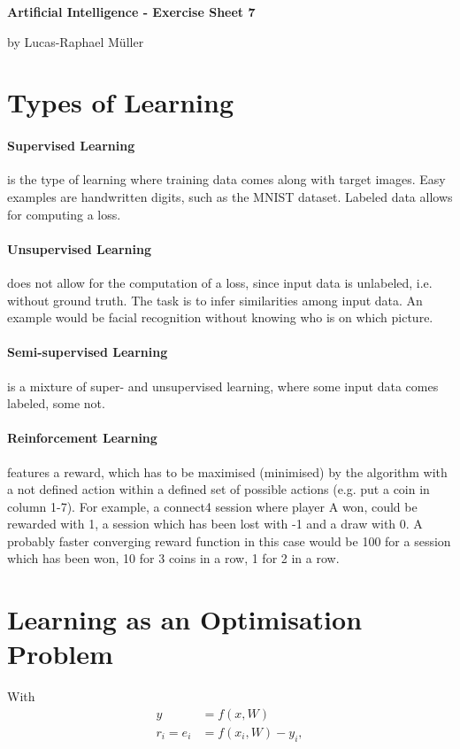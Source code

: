 \documentclass[11pt,a4paper,twoside]{article}
\begin{document}
\renewcommand\thesubsection{\alph{subsection})}

\lstset {
language = bash,
	breaklines = true,
	breakatwhitespace = true
}

\centerline{\LARGE \textbf{Artificial Intelligence - Exercise Sheet 7}}\vspace{0.5em}
\centerline{\large by Lucas-Raphael Müller}\vspace{2em}


\section{Types of Learning}
\paragraph{Supervised Learning} is the type of learning where training data comes along with target images. Easy examples are handwritten digits, such as the MNIST dataset. Labeled data allows for computing a loss.
\paragraph{Unsupervised Learning} does not allow for the computation of a loss, since input data is unlabeled, i.e. without ground truth.
The task is to infer similarities among input data.  
An example would be facial recognition without knowing who is on which picture.
\paragraph{Semi-supervised Learning} is a mixture of super- and unsupervised learning, where some input data comes labeled, some not.
\paragraph{Reinforcement Learning} features a reward, which has to be maximised (minimised) by the algorithm with a not defined action within a defined set of possible actions (e.g. put a coin in column 1-7).
For example, a connect4 session where player A won, could be rewarded with 1, a session which has been lost with -1 and a draw with 0.
A probably faster converging reward function in this case would be 100 for a session which has been won, 10 for 3 coins in a row, 1 for 2 in a row.

\section{Learning as an Optimisation Problem}
With
\begin{align}
	y &= f(x,W) \\
	r_i = e_i &= f(x_i,W) - y_i,
\end{align}
\end{document}
